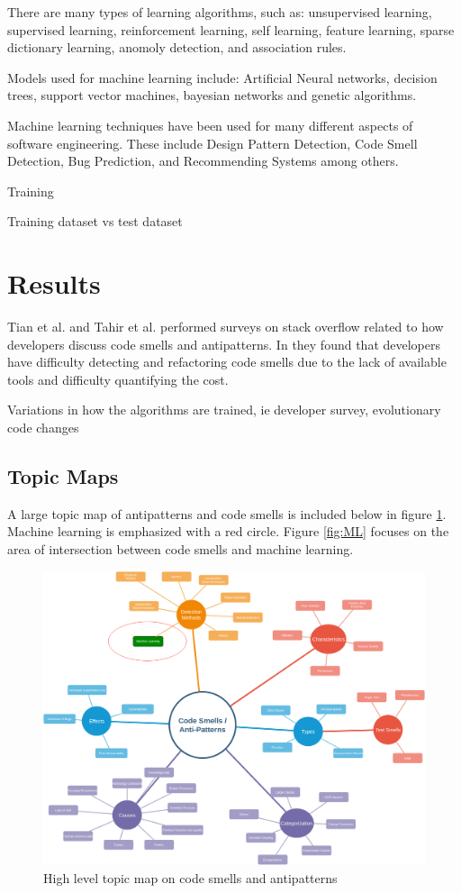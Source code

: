 \documentclass[conference]{IEEEtran}
\begin{document}
There are many types of learning algorithms, such as: unsupervised learning, supervised learning, reinforcement learning, self learning, feature learning, sparse dictionary learning, anomoly detection, and association rules.

Models used for machine learning include: Artificial Neural networks, decision trees, support vector machines, bayesian networks and genetic algorithms.

Machine learning techniques have been used for many different aspects of software engineering\cite{fontana_code_2017}. These include Design Pattern Detection, Code Smell Detection, Bug Prediction, and Recommending Systems among others.

Training

Training dataset vs test dataset

\section{Results}
Tian et al.\cite{tian_how_2019} and Tahir et al.\cite{tahir_can_2018} performed surveys on stack overflow related to how developers discuss code smells and antipatterns. In \cite{tian_how_2019} they found that developers have difficulty detecting and refactoring code smells due to the lack of available tools and difficulty quantifying the cost.

Variations in how the algorithms are trained, ie developer survey, evolutionary code changes
\subsection{Topic Maps}

A large topic map of antipatterns and code smells is included below in figure \ref{fig:TM}.
Machine learning is emphasized with a red circle. 
Figure \ref{fig:ML} focuses on the area of intersection between code smells and machine learning.
\begin{figure}[ht]
  \centerline{\includegraphics[width=\linewidth]{AntiPattern-TopicMap.png}}
  \caption{High level topic map on code smells and antipatterns}
  \label{fig:TM}
\end{figure} 
\end{document}
